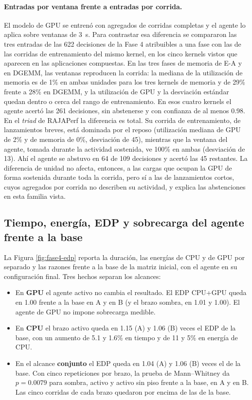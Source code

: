 \paragraph{Entradas por ventana frente a entradas por corrida.} El modelo de GPU se entrenó con agregados de corridas completas y el agente lo aplica sobre ventanas de 3~s. Para contrastar esa diferencia se compararon las tres entradas de las 622 decisiones de la Fase 4 atribuibles a una fase con las de las corridas de entrenamiento del mismo kernel, en los cinco kernels vistos que aparecen en las aplicaciones compuestas. En las tres fases de memoria de E-A y en DGEMM, las ventanas reproducen la corrida: la mediana de la utilización de memoria es de 1\% en ambas unidades para los tres kernels de memoria y de 29\% frente a 28\% en DGEMM, y la utilización de GPU y la desviación estándar quedan dentro o cerca del rango de entrenamiento. En esos cuatro kernels el agente acertó las 261 decisiones, sin abstenerse y con confianza de al menos 0.98. En el \textit{triad} de RAJAPerf la diferencia es total. Su corrida de entrenamiento, de lanzamientos breves, está dominada por el reposo (utilización mediana de GPU de 2\% y de memoria de 0\%, desviación de 45), mientras que la ventana del agente, tomada durante la actividad sostenida, ve 100\% en ambas (desviación de 13). Ahí el agente se abstuvo en 64 de 109 decisiones y acertó las 45 restantes. La diferencia de unidad no afecta, entonces, a las cargas que ocupan la GPU de forma sostenida durante toda la corrida, pero sí a las de lanzamientos cortos, cuyos agregados por corrida no describen su actividad, y explica las abstenciones en esta familia vista.



\subsection{Tiempo, energía, EDP y sobrecarga del agente frente a la base}
\label{sec:resultados-fase4-edp}\label{sec:resultados-fase4-costo}

La Figura \ref{fig:fase4-edp} reporta la duración, las energías de CPU y de GPU por separado y las razones frente a la base de la matriz inicial, con el agente en su configuración final. Tres hechos separan los alcances:

\begin{itemize}
    \item En \textbf{GPU} el agente activo no cambia el resultado. El EDP CPU+GPU queda en 1.00 frente a la base en A y en B (y el brazo sombra, en 1.01 y 1.00). El agente de GPU no impone sobrecarga medible.
    \item En \textbf{CPU} el brazo activo queda en 1.15 (A) y 1.06 (B) veces el EDP de la base, con un aumento de 5.1 y 1.6\% en tiempo y de 11 y 5\% en energía de CPU.
    \item En el alcance \textbf{conjunto} el EDP queda en 1.04 (A) y 1.06 (B) veces el de la base. Con cinco repeticiones por brazo, la prueba de Mann--Whitney da $p = 0.0079$ para sombra, activo y activo sin piso frente a la base, en A y en B. Las cinco corridas de cada brazo quedaron por encima de las de la base.
\end{itemize}

